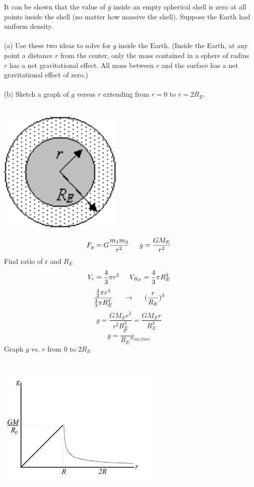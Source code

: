 \documentclass{article}
\begin{document}
\begin{multicols}{2}
  It can be shown that the value of $g$ inside an empty spherical shell is zero at all points inside the shell (no matter how massive the shell).  Suppose the Earth had uniform density.\\\\ (a) Use these two ideas to solve for $g$ inside the Earth. (Inside the Earth, at any point a distance $r$ from the center, only the mass contained in a sphere of radius $r$ has a net gravitational effect.  All mass between $r$ and the surface has a net gravitational effect of zero.)\\\\ (b) Sketch a graph of $g$ versus $r$ extending from $r = 0$ to $r = 2R_E$.\\\\            \centerline{\includegraphics[width=6cm]{p27.png}}
  \vfill
  \columnbreak
  \[
  F_g=G\frac{m_1m_2}{r^2} \indent
  g=\frac{GM_E}{r^2}
  \]
  Find ratio of r and $R_E$
  \[
  V_r=\frac{4}{3}\pi r^3 \indent
  V_{R_E}=\frac{4}{3}\pi R_E^3
  \]
  \[
  \frac
      {\frac{4}{3}\pi r^3}
      {\frac{4}{3}\pi R_E^3}
      \indent
      \rightarrow
      \indent
      (\frac{r}{R_E})^3
      \]
      \[
      g=\frac{GM_Er^3}{r^2R_E^3}=\frac{GM_Er}{R_E^3}
      \]
      \[
      g=\frac{r}{R_E}g_{surface}
      \]
      Graph $g$ vs. $r$ from $0$ to $2R_E$\\\\
      \centerline{\includegraphics[width=8cm]{graph27.png}}
\end{multicols}
\end{document}
